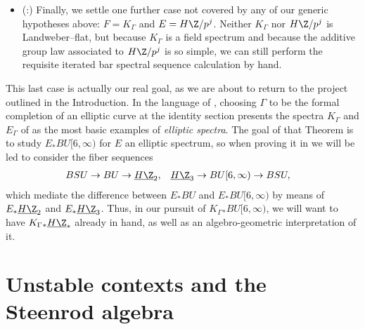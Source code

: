 \begin{itemize}
\begin{align*}
\CatOf{Spectra} & \xrightarrow{\Loops^\infty} \CatOf{Loopspaces} \\
& \xrightarrow{\HFp_*} \CatOf{GradedHopfAlgebras}^{>0, \fin}_{\F_p/} \\
& \xrightarrow{D_*} \CatOf{GradedDMods} \\
& \subseteq \CatOf{GradedModules}_{\Cart}
\end{align*}
to give a homological functor.  This means that the Dieudonn\'e module associated to an infinite loopspace varies stably with the spectrum underlying the loopspace, which is enough leverage to the settle the case where $E$ is any Landweber--flat theory.
\item (:) Finally, we settle one further case not covered by any of our generic hypotheses above: $F = K_\Gamma$ and $E = H\Z/p^j$.  Neither $K_\Gamma$ nor $H\Z/p^j$ is Landweber--flat, but because $K_\Gamma$ is a field spectrum and because the additive group law associated to $H\Z/p^j$ is so simple, we can still perform the requisite iterated bar spectral sequence calculation by hand.
\end{itemize}

This last case is actually our real goal, as we are about to return to the project outlined in the Introduction.  In the language of , choosing $\Gamma$ to be the formal completion of an elliptic curve at the identity section presents the spectra $K_\Gamma$ and $E_\Gamma$ of  as the most basic examples of \textit{elliptic spectra}.  The goal of that Theorem is to study $E_* BU[6, \infty)$ for $E$ an elliptic spectrum, so when proving it in  we will be led to consider the fiber sequences
\begin{align*}
BSU \to BU & \to \OS{H\Z}{2}, & \OS{H\Z}{3} \to BU[6, \infty) & \to BSU,
\end{align*}
which mediate the difference between $E_* BU$ and $E_* BU[6, \infty)$ by means of $E_* \OS{H\Z}{2}$ and $E_* \OS{H\Z}{3}$.  Thus, in our pursuit of $K_\Gamma{}_* BU[6, \infty)$, we will want to have $K_\Gamma{}_* \OS{H\Z}{*}$ already in hand, as well as an algebro-geometric interpretation of it.









\section{Unstable contexts and the Steenrod algebra}\label{UnstableContextsSection}


